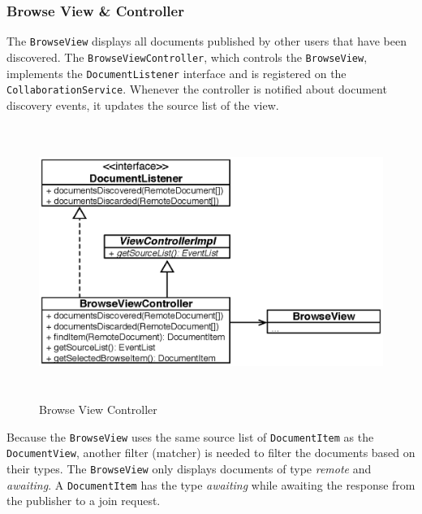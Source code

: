 


\subsubsection{Browse View \& Controller}
The \texttt{Browse\-View} displays all documents published by other users that have been discovered. The \texttt{Browse\-View\-Controller}, which controls the \texttt{Browse\-View}, implements the \texttt{Document\-Listener} interface and is registered on the \texttt{Collaboration\-Service}. Whenever the controller is notified about document discovery events, it updates the source list of the view.

\begin{figure}[H]
\begin{center}
  \includegraphics[height=3.5in, width=5.62in]{../images/finalreport/application_browseview.eps}
\caption{Browse View Controller}
\label{application_browseview}
\end{center}
\end{figure}

Because the \texttt{Browse\-View} uses the same source list of \texttt{Document\-Item} as the \texttt{Document\-View}, another filter (matcher) is needed to filter the documents based on their types. The \texttt{Browse\-View} only displays documents of type \emph{remote} and \emph{awaiting}. A \texttt{Document\-Item} has the type \emph{awaiting} while awaiting the response from the publisher to a join request.

